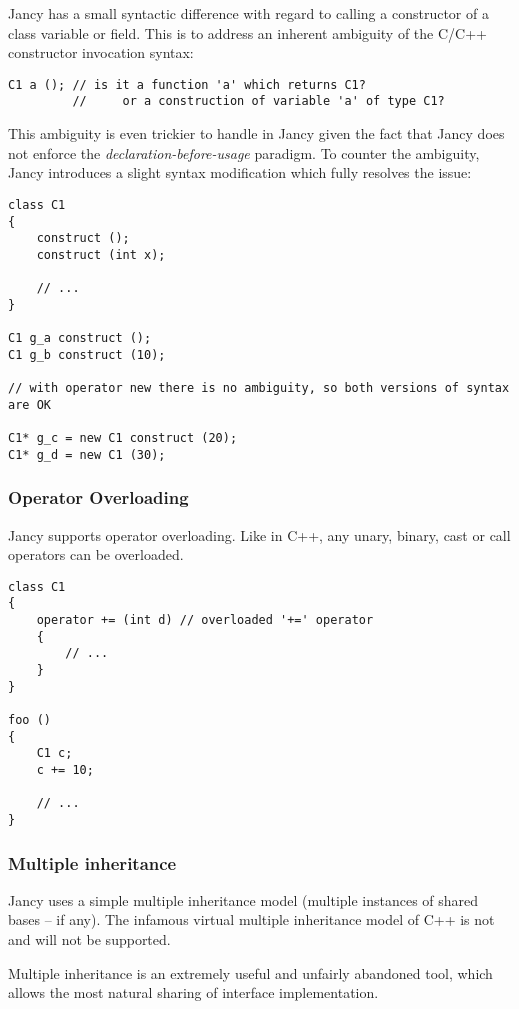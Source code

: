 \documentclass[oneside]{book}
\begin{document}
Jancy has a small syntactic difference with regard to calling a constructor of a class variable or field. This is to address an inherent ambiguity of the C/C++ constructor invocation syntax:

\begin{lstlisting}
C1 a (); // is it a function 'a' which returns C1?
         //     or a construction of variable 'a' of type C1?
\end{lstlisting}

This ambiguity is even trickier to handle in Jancy given the fact that Jancy does not enforce the \emph{declaration-before-usage} paradigm. To counter the ambiguity, Jancy introduces a slight syntax modification which fully resolves the issue:

\begin{lstlisting}
class C1
{
    construct ();
    construct (int x);

    // ...
}

C1 g_a construct (); 
C1 g_b construct (10);

// with operator new there is no ambiguity, so both versions of syntax are OK

C1* g_c = new C1 construct (20); 
C1* g_d = new C1 (30);
\end{lstlisting}

\subsubsection{Operator Overloading}

Jancy supports operator overloading. Like in C++, any unary, binary, cast or call operators can be overloaded.

\begin{lstlisting}
class C1
{
    operator += (int d) // overloaded '+=' operator 
    {
        // ...
    }
}

foo ()
{
    C1 c;
    c += 10;

    // ...
}
\end{lstlisting}

\subsubsection{Multiple inheritance}

Jancy uses a simple multiple inheritance model (multiple instances of shared bases -- if any). The infamous virtual multiple inheritance model of C++ is not and will not be supported.

Multiple inheritance is an extremely useful and unfairly abandoned tool, which allows the most natural sharing of interface implementation.
\end{document}
